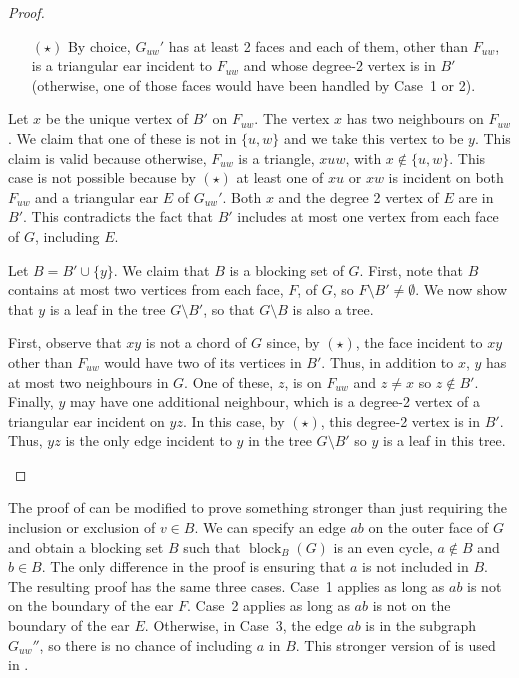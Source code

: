 \documentclass{patmorin}
\DeclareMathOperator{\block}{block}
\begin{document}
\begin{proof}
\begin{enumerate}
  \begin{itemize}
  \item[$(\star)$]
  By choice, $G_{uw}'$ has at least 2 faces and each of them, other
  than $F_{uw}$, is a triangular ear incident to $F_{uw}$ and whose
  degree-2 vertex is in $B'$ (otherwise, one of those faces would have
  been handled by Case~1 or 2).
  \end{itemize}

  Let $x$ be the unique vertex of $B'$ on $F_{uw}$. The vertex $x$ has two
  neighbours on $F_{uw}$.  We claim that one of these is not in $\{u,w\}$
  and we take this vertex to be $y$.  This claim is valid because
  otherwise, $F_{uw}$ is a triangle, $xuw$, with $x\not\in\{u,w\}$.
  This case is not possible because by $(\star)$ at least one of $xu$ or
  $xw$ is incident on both $F_{uw}$ and a triangular ear $E$ of $G_{uw}'$.
  Both $x$ and the degree 2 vertex of $E$ are in $B'$.  This contradicts
  the fact that $B'$ includes at most one vertex from each face of $G$,
  including $E$.

  Let $B=B'\cup\{y\}$.  We claim that $B$ is a blocking set of $G$.
  First, note that $B$ contains at most two vertices from each face, $F$,
  of $G$, so $F\setminus B'\neq \emptyset$.  We now show that $y$ is a
  leaf in the tree $G\setminus B'$, so that $G\setminus B$ is also a tree.

  First, observe that $xy$ is not a chord of $G$ since, by $(\star)$,
  the face incident to $xy$ other than $F_{uw}$ would have two of its
  vertices in $B'$.  Thus, in addition to $x$, $y$ has at most two
  neighbours in $G$.  One of these, $z$, is on $F_{uw}$ and $z\neq x$
  so $z\notin B'$.  Finally, $y$ may have one additional neighbour,
  which is a degree-2 vertex of a triangular ear incident on $yz$.
  In this case, by $(\star)$, this degree-2 vertex is in $B'$.  Thus,
  $yz$ is the only edge incident to $y$ in the tree $G\setminus B'$
  so $y$ is a leaf in this tree. \qedhere
\end{enumerate}
\end{proof}

\begin{rem}
   The proof of  can be modified to prove
   something stronger than just requiring the inclusion or exclusion
   of $v\in B$.  We can specify an edge $ab$ on the outer face of $G$
   and obtain a blocking set $B$ such that $\block_B(G)$ is an even
   cycle, $a\not\in B$ and $b\in B$.  The only difference in the proof
   is ensuring that $a$ is not included in $B$. The resulting proof
   has the same three cases. Case~1 applies as long as $ab$ is not on
   the boundary of the ear $F$. Case~2 applies as long as $ab$ is not
   on the boundary of the ear $E$.  Otherwise, in Case~3, the edge $ab$
   is in the subgraph $G_{uw}''$, so there is no chance of including $a$
   in $B$.  This stronger version of  is used
   in .
\end{rem}
\end{document}
